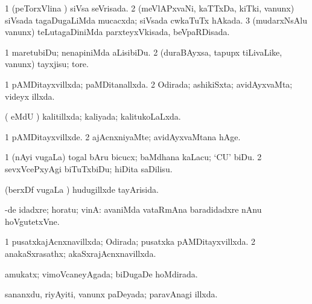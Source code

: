 {{\bentry 
{} 
\gl{\gu}
\expl{}
\bmng
\bnum
\num{1} (peTorxVlina \vi) siVsa seVrisada. 
\num{2} (meVlAPxvaNi, kaTTxDa, kiTki, \mo vanunx) siVsada tagaDugaLiMda mucacxda; siVsada cwkaTuTx hAkada. 
\num{3} (mudarxNsAlu \mo vanunx) teLutagaDiniMda parxteyxVkisada, beVpaRDisada. 
\enum
\emng
\eentry

\bentry
{} 
\gl{\sakirx}
\bmng
\bnum
\num{1} maretubiDu; nenapiniMda aLisibiDu. 
\num{2} (duraBAyxsa, tapupx tiLivaLike, \mo vanunx) tayxjisu; tore. 
\enum
\emng
\eentry

\bentry
{} 
\gl{\gu}
\expl{}
\bmng
\bnum
\num{1} pAMDitayxvillxda; paMDitanallxda. 
\num{2} Odirada; ashikiSxta; avidAyxvaMta; videyx illxda. 
\enum
\emng
\eentry

\bentry
{} 
\gl{\gu}
\expl{}
\bmng
( eMdU \parx) kalitillxda; kaliyada; kalitukoLaLxda. 
\emng
\eentry

\bentry
{} 
\gl{\kirxvi}
\expl{}
\bmng
\bnum
\num{1} pAMDitayxvillxde. 
\num{2} ajAcnxniyaMte; avidAyxvaMtana hAge. 
\enum
\emng
\eentry

\bentry
{} 
\gl{\sakirx}
\expl{}
\bmng
\bnum
\num{1} (nAyi \mo vugaLa) togal bAru bicucx; baMdhana kaLacu; `CU' biDu. 
\num{2} sevxVcePxyAgi biTuTxbiDu; hiDita saDilisu. 
\enum
\emng
\eentry

\bentry
{} 
\gl{\gu}
\expl{}
\bmng
(berxDf \mo vugaLa \vi) hudugillxde tayArisida. 
\emng
\eentry

\bentry
{} 
\gl{\saMavayx}
\expl{}
\bmng
-de idadxre; horatu; vinA:  avaniMda vataRmAna baradidadxre nAnu hoVgutetxVne. 
\emng
\eentry

\bentry
{} 
\gl{\gu}
\expl{}
\bmng
\bnum
\num{1} pusatxkajAcnxnavillxda; Odirada; pusatxka pAMDitayxvillxda. 
\num{2} anakaSxrasathx; akaSxrajAcnxnavillxda. 
\enum
\emng
\eentry

\bentry
{} 
\gl{\gu}
\expl{}
\bmng
amukatx; vimoVcaneyAgada; biDugaDe hoMdirada. 
\emng
\eentry

\bentry
{} 
\gl{\gu}
\expl{}
\bmng
sananxdu, riyAyiti, \mo vanunx paDeyada; paravAnagi illxda. 
\emng
\eentry

}}
